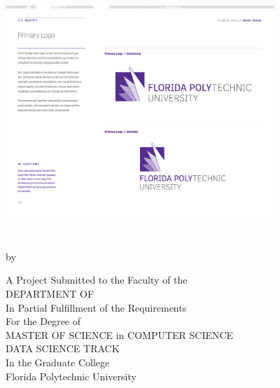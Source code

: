 %
%
%

\begin{center} 
    \includegraphics[width=4in]{Content/Images/FLPoly_logo.pdf}\\\vspace*{25mm}
	{{\bfseries\large{\MakeUppercase{\thesisTitle} \\}}\par}
	\vspace*{15mm}
	{by\\\vspace*{2mm}\textsc{\thesisBy}\par}
	\vspace*{15mm}
	A Project Submitted to the Faculty of the \\
	DEPARTMENT OF {\MakeUppercase{\thesisDegreeDepartment}}\\
	In Partial Fulfillment of the Requirements\\
	For the Degree of\\
	MASTER OF SCIENCE in COMPUTER SCIENCE\\
	DATA SCIENCE TRACK\\ 
	In the Graduate College\\\vspace*{1.5mm}
	Florida Polytechnic University\\\vspace*{10mm}
	\small \thesisDate \\\vspace*{1.5mm}
	\vfill
    ~
\end{center}
\pagebreak